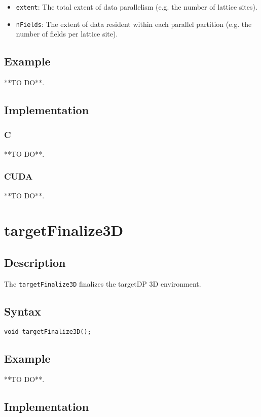\begin{itemize}
\item \verb+extent+: The total extent of data parallelism (e.g. the number of lattice sites).
\item \verb+nFields+: The extent of data resident within each parallel partition (e.g. the number of fields per lattice site).
\end{itemize}


\subsection{Example}
**TO DO**.
\subsection{Implementation}
\subsubsection{C}
**TO DO**.
\subsubsection{CUDA}
**TO DO**.

\newpage
\section{targetFinalize3D}

\subsection{Description}

The \verb+targetFinalize3D+ finalizes the targetDP 3D environment.

\subsection{Syntax}
\begin{verbatim}
void targetFinalize3D();
\end{verbatim}

\subsection{Example}
**TO DO**.

\subsection{Implementation}
